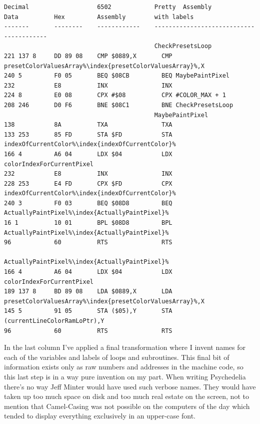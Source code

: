 \begin{lstlisting}[basicstyle=\ttfamily\scriptsize,escapechar=\%]
Decimal                   6502            Pretty  Assembly
Data          Hex         Assembly        with labels
-------       --------    ------------    ----------------------------------------
                                          CheckPresetsLoop
221 137 8     DD 89 08    CMP $0889,X       CMP presetColorValuesArray%\index{presetColorValuesArray}%,X             
240 5         F0 05       BEQ $08CB         BEQ MaybePaintPixel                                        
232           E8          INX               INX                                              
224 8         E0 08       CPX #$08          CPX #COLOR_MAX + 1                               
208 246       D0 F6       BNE $08C1         BNE CheckPresetsLoop                                        
                                          MaybePaintPixel   
138           8A          TXA               TXA                                      
133 253       85 FD       STA $FD           STA indexOfCurrentColor%\index{indexOfCurrentColor}%                          
166 4         A6 04       LDX $04           LDX colorIndexForCurrentPixel                    
232           E8          INX               INX                                              
228 253       E4 FD       CPX $FD           CPX indexOfCurrentColor%\index{indexOfCurrentColor}%                          
240 3         F0 03       BEQ $08D8         BEQ ActuallyPaintPixel%\index{ActuallyPaintPixel}%                           
16 1          10 01       BPL $08D8         BPL ActuallyPaintPixel%\index{ActuallyPaintPixel}%                           
96            60          RTS               RTS                                              
                                          ActuallyPaintPixel%\index{ActuallyPaintPixel}%                               
166 4         A6 04       LDX $04           LDX colorIndexForCurrentPixel                    
189 137 8     BD 89 08    LDA $0889,X       LDA presetColorValuesArray%\index{presetColorValuesArray}%,X                     
145 5         91 05       STA ($05),Y       STA (currentLineColorRamLoPtr),Y       
96            60          RTS               RTS                               
\end{lstlisting}

In the last column I've applied a final transformation where I invent names for each of the variables and
labels of loops and subroutines. This final bit of information exists only as raw numbers and addresses
in the machine code, so this last step is in a way pure invention on my part. When writing Psychedelia
there's no way Jeff Minter would have used such verbose names. They would have taken up too much space on
disk and too much real estate on the screen, not to mention that Camel-Casing was not possible on the computers
of the day which tended to display everything exclusively in an upper-case font. 

